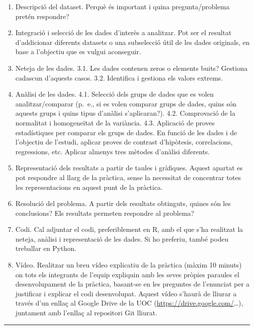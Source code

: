 \documentclass[
]{article}
\providecommand{\tightlist}{%
  \setlength{\itemsep}{0pt}\setlength{\parskip}{0pt}}
\begin{document}
\begin{enumerate}
\def\labelenumi{\arabic{enumi}.}
\tightlist
\item
  Descripció del dataset. Perquè és important i quina pregunta/problema
  pretén respondre?
\item
  Integració i selecció de les dades d'interès a analitzar. Pot ser el
  resultat d'addicionar diferents datasets o una subselecció útil de les
  dades originals, en base a l'objectiu que es vulgui aconseguir.
\item
  Neteja de les dades. 3.1. Les dades contenen zeros o elements buits?
  Gestiona cadascun d'aquests casos. 3.2. Identifica i gestiona els
  valors extrems.
\item
  Anàlisi de les dades. 4.1. Selecció dels grups de dades que es volen
  analitzar/comparar (p.~e., si es volen comparar grups de dades, quins
  són aquests grups i quins tipus d'anàlisi s'aplicaran?). 4.2.
  Comprovació de la normalitat i homogeneïtat de la variància. 4.3.
  Aplicació de proves estadístiques per comparar els grups de dades. En
  funció de les dades i de l'objectiu de l'estudi, aplicar proves de
  contrast d'hipòtesis, correlacions, regressions, etc. Aplicar almenys
  tres mètodes d'anàlisi diferents.
\item
  Representació dels resultats a partir de taules i gràfiques. Aquest
  apartat es pot respondre al llarg de la pràctica, sense la necessitat
  de concentrar totes les representacions en aquest punt de la pràctica.
\item
  Resolució del problema. A partir dels resultats obtinguts, quines són
  les conclusions? Els resultats permeten respondre al problema?
\item
  Codi. Cal adjuntar el codi, preferiblement en R, amb el que s'ha
  realitzat la neteja, anàlisi i representació de les dades. Si ho
  preferiu, també podeu treballar en Python.
\item
  Vídeo. Realitzar un breu vídeo explicatiu de la pràctica (màxim 10
  minuts) on tots els integrants de l'equip expliquin amb les seves
  pròpies paraules el desenvolupament de la pràctica, basant-se en les
  preguntes de l'enunciat per a justificar i explicar el codi
  desenvolupat. Aquest vídeo s'haurà de lliurar a través d'un enllaç al
  Google Drive de la UOC (\url{https://drive.google.com/}\ldots),
  juntament amb l'enllaç al repositori Git lliurat.
\end{enumerate}

\begin{center}\rule{0.5\linewidth}{0.5pt}\end{center}
\end{document}
